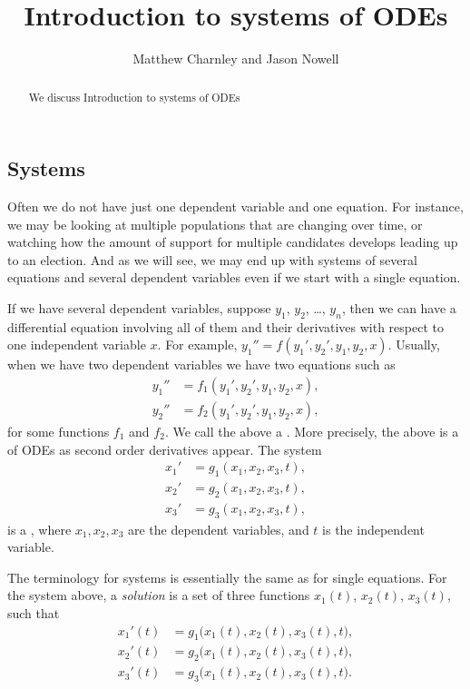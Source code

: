 \documentclass{ximera}
\title{Introduction to systems of ODEs}
\author{Matthew Charnley and Jason Nowell}
\begin{document}
\begin{abstract}
    We discuss Introduction to systems of ODEs
\end{abstract}
\maketitle

\label{sec:introtosys}


\subsection{Systems}

Often we do not have just one dependent variable and one equation. For instance, we may be looking at multiple populations that are changing over time, or watching how the amount of support for multiple candidates develops leading up to an election. And as we will see, we may end up with systems of several equations and several dependent variables even if we start with a single equation.

If we have several dependent variables, suppose $y_1$, $y_2$, \ldots, $y_n$, then we can have a differential equation involving all of them and their derivatives with respect to one independent variable $x$. For example, $y_1'' = f(y_1',y_2',y_1,y_2,x)$. Usually, when we have two dependent variables we have two equations such as
\begin{align*}
    y_1'' & = f_1(y_1',y_2',y_1,y_2,x) , \\
    y_2'' & = f_2(y_1',y_2',y_1,y_2,x) ,
\end{align*}
for some functions $f_1$ and $f_2$.  We call the above a \emph{}. More precisely, the above is a \emph{} of ODEs as second order derivatives appear. The system
\begin{align*}
    x_1' & = g_1(x_1,x_2,x_3,t) , \\
    x_2' & = g_2(x_1,x_2,x_3,t) , \\
    x_3' & = g_3(x_1,x_2,x_3,t) ,
\end{align*}
is a \emph{}, where $x_1,x_2,x_3$ are the dependent variables, and $t$ is the independent variable.

The terminology for systems is essentially the same as for single equations. For the system above, a \emph{solution} is a set of three functions $x_1(t)$, $x_2(t)$, $x_3(t)$, such that
\begin{align*}
    x_1'(t) &= g_1\bigl(x_1(t),x_2(t),x_3(t),t\bigr) , \\
    x_2'(t) &= g_2\bigl(x_1(t),x_2(t),x_3(t),t\bigr) , \\
    x_3'(t) &= g_3\bigl(x_1(t),x_2(t),x_3(t),t\bigr) .
\end{align*}
\end{document}
